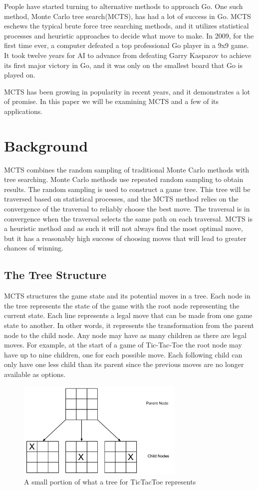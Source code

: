 \documentclass{sig-alternate}
\begin{document}
People have started turning to alternative methods to approach Go. One such method, Monte Carlo tree search(MCTS), has had a lot of success in Go. MCTS eschews the typical brute force tree searching methods, and it utilizes statistical processes and heuristic approaches to decide what move to make. In 2009, for the first time ever, a computer defeated a top professional Go player in a 9x9 game\cite{TheGrandChallenge}. It took twelve years for AI to advance from defeating Garry Kasparov to achieve its first major victory in Go, and it was only on the smallest board that Go is played on.

MCTS has been growing in popularity in recent years, and it demonstrates a lot of promise. In this paper we will be examining MCTS and a few of its applications.  
\section{Background}
MCTS combines the random sampling of traditional Monte Carlo methods with tree searching. Monte Carlo methods use repeated random sampling to obtain results. The random sampling is used to construct a game tree. This tree will be traversed based on statistical processes, and the MCTS method relies on the convergence of the traversal to reliably choose the best move. The traversal is in convergence when the traversal selects the same path on each traversal. MCTS is a heuristic method and as such it will not always find the most optimal move, but it has a reasonably high success of choosing moves that will lead to greater chances of winning.
\subsection{The Tree Structure}
MCTS structures the game state and its potential moves in a tree. Each node in the tree represents the state of the game with the root node representing the current state. Each line represents a legal move that can be made from one game state to another. In other words, it represents the transformation from the parent node to the child node. Any node may have as many children as there are legal moves. For example, at the start of a game of Tic-Tac-Toe the root node may have up to nine children, one for each possible move. Each following child can only have one less child than its parent since the previous moves are no longer available as options.

\begin{figure}[h]
\includegraphics[width=8cm]{TicTacToeTree.pdf}
\centering
\caption{A small portion of what a tree for TicTacToe represents}
\label{fig:TicTacToe}
\end{figure}
\end{document}
